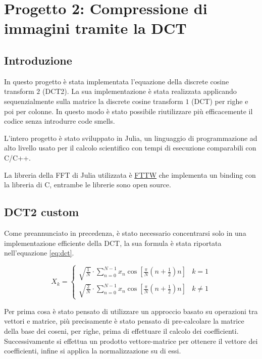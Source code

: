 \chapter{Progetto 2: Compressione di immagini tramite la DCT}

\section{Introduzione}
In questo progetto è stata implementata l'equazione della discrete cosine transform $2$ (DCT2).
La sua implementazione è stata realizzata applicando sequenzialmente sulla matrice
la discrete cosine transform $1$ (DCT) per righe e poi per colonne. In questo modo
è stato possibile riutilizzare più efficacemente il codice senza introdurre code
smells.

L'intero progetto è stato sviluppato in Julia, un linguaggio di programmazione ad
alto livello usato per il calcolo scientifico con tempi di esecuzione comparabili
con C/C++.

La libreria della FFT di Julia utilizzata è \href{https://github.com/JuliaMath/FFTW.jl}{FTTW}
che implementa un binding con la libreria di C, entrambe le librerie sono open source.

\section{DCT2 custom}
Come preannunciato in precedenza, è stato necessario concentrarsi solo in una implementazione
efficiente della DCT, la sua formula è stata riportata nell'equazione \ref{eq:dct}.

\begin{equation}
    X_k = \begin{cases}
        \sqrt{\frac{1}{N}}\cdot \sum_{n=0}^{N-1} x_n \cos\left[\frac{\pi}{N}\left(n + \frac{1}{2}\right) n \right] & k=1     \\
        \sqrt{\frac{2}{N}}\cdot\sum _{n=0}^{N-1}x_{n}\cos \left[\frac{\pi}{N}\left(n+\frac{1}{2}\right)n\right]    & k \ne 1
    \end{cases}
    \label{eq:dct}
\end{equation}

Per prima cosa è stato pensato di utilizzare un approccio basato su operazioni
tra vettori e matrice, più precisamente è stato pensato di pre-calcolare la matrice
della base dei coseni, per righe, prima di effettuare il calcolo dei coefficienti.
Successivamente si effettua un prodotto vettore-matrice per ottenere il vettore
dei coefficienti, infine si applica la normalizzazione su di essi.

